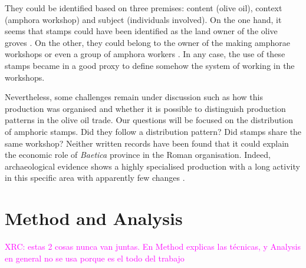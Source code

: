 \documentclass[review]{elsarticle}
\newcommand{\memo}[2]{\textcolor{#1}{#2}}
\newcommand{\xavi}[1]{\memo{magenta}{XRC: #1\\}}
\begin{document}
They could be identified based on three premises: content (olive oil), context (amphora workshop) and subject (individuals involved). On the one hand, it seems that stamps could have been identified as the land owner of the olive groves \citep{rodriguez_economioleicola_1977}. On the other, they could belong to the owner of the making amphorae workshops or even a group of amphora workers \citep{berni_millet_epigrafianforica_2008}. In any case, the use of these stamps became in a good proxy to define somehow the system of working in the workshops. 

Nevertheless, some challenges remain under discussion such as how this production was organised and whether it is possible to distinguish production patterns in the olive oil trade. Our questions will be focused on the distribution of amphoric stamps. Did they follow a distribution pattern? Did stamps share the same workshop? Neither written records have been found that it could explain the economic role of \textit{Baetica} province in the Roman organisation. Indeed, archaeological evidence shows a highly specialised production with a long activity in this specific area with apparently few changes \citep{remesal_anforas_2004}. 




\section{Method and Analysis}
\xavi{estas 2 cosas nunca van juntas. En Method explicas las técnicas, y Analysis en general no se usa porque es el todo del trabajo}
\end{document}
